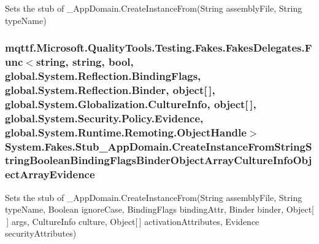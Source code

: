 Sets the stub of \-\_\-\-App\-Domain.\-Create\-Instance\-From(\-String assembly\-File, String type\-Name)

\hypertarget{class_system_1_1_fakes_1_1_stub___app_domain_ae6807c99cb243901cd410998bdb9aaf7}{
\subsubsection[{Create\-Instance\-From\-String\-String\-Boolean\-Binding\-Flags\-Binder\-Object\-Array\-Culture\-Info\-Object\-Array\-Evidence}]{\setlength{\rightskip}{0pt plus 5cm}mqttf.\-Microsoft.\-Quality\-Tools.\-Testing.\-Fakes.\-Fakes\-Delegates.\-Func$<$string, string, bool, global.\-System.\-Reflection.\-Binding\-Flags, global.\-System.\-Reflection.\-Binder, object\mbox{[}$\,$\mbox{]}, global.\-System.\-Globalization.\-Culture\-Info, object\mbox{[}$\,$\mbox{]}, global.\-System.\-Security.\-Policy.\-Evidence, global.\-System.\-Runtime.\-Remoting.\-Object\-Handle$>$ System.\-Fakes.\-Stub\-\_\-\-App\-Domain.\-Create\-Instance\-From\-String\-String\-Boolean\-Binding\-Flags\-Binder\-Object\-Array\-Culture\-Info\-Object\-Array\-Evidence}}\label{class_system_1_1_fakes_1_1_stub___app_domain_ae6807c99cb243901cd410998bdb9aaf7}


Sets the stub of \-\_\-\-App\-Domain.\-Create\-Instance\-From(\-String assembly\-File, String type\-Name, Boolean ignore\-Case, Binding\-Flags binding\-Attr, Binder binder, Object\mbox{[}$\,$\mbox{]} args, Culture\-Info culture, Object\mbox{[}$\,$\mbox{]} activation\-Attributes, Evidence security\-Attributes)

